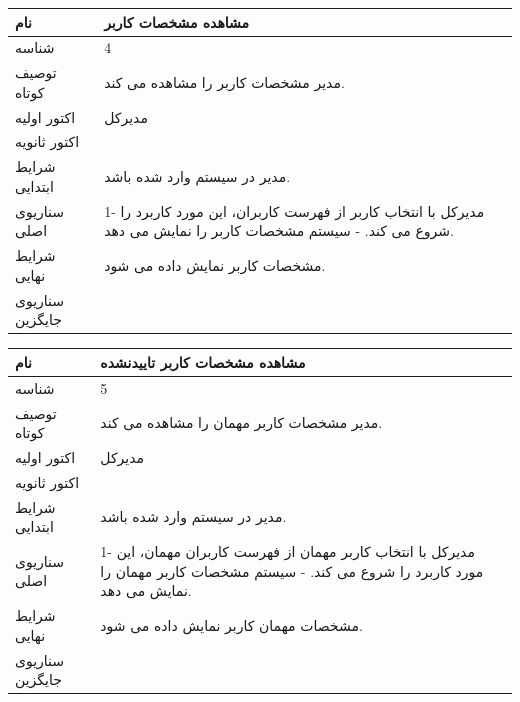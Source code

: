 \documentclass{article}
\begin{document}
\begin{tabular}{|p{2cm}|p{10cm}|}
\hline
نام
&
مشاهده مشخصات کاربر
\\
\hline
شناسه
&
4
\\
\hline
توصیف کوتاه
&
مدیر مشخصات کاربر را مشاهده می کند.
\\
\hline
اکتور اولیه
&
مدیرکل
\\
\hline
اکتور ثانویه
&

\\
\hline
شرایط ابتدایی
&
مدیر در سیستم وارد شده باشد.
\\
\hline
سناریوی اصلی
&
1-	مدیرکل با انتخاب کاربر از فهرست کاربران، این مورد کاربرد را شروع می کند.
\newline
2-	سیستم مشخصات کاربر را نمایش می دهد.
\\
\hline
شرایط نهایی
&
مشخصات کاربر نمایش داده می شود.
\\
\hline
سناریوی جایگزین
&

\\
\hline
\end{tabular}

\vspace{2cm}

\begin{tabular}{|p{2cm}|p{10cm}|}
\hline
نام
&
مشاهده مشخصات کاربر تاییدنشده
\\
\hline
شناسه
&
5
\\
\hline
توصیف کوتاه
&
مدیر مشخصات کاربر مهمان را مشاهده می کند.
\\
\hline
اکتور اولیه
&
مدیرکل
\\
\hline
اکتور ثانویه
&

\\
\hline
شرایط ابتدایی
&
مدیر در سیستم وارد شده باشد.
\\
\hline
سناریوی اصلی
&
1-	مدیرکل با انتخاب کاربر مهمان از فهرست کاربران مهمان، این مورد کاربرد را شروع می کند.
\newline
2-	سیستم مشخصات کاربر مهمان را نمایش می دهد.
\\
\hline
شرایط نهایی
&
مشخصات مهمان کاربر نمایش داده می شود.
\\
\hline
سناریوی جایگزین
&

\\
\hline
\end{tabular}

\vspace{2cm}
\end{document}
